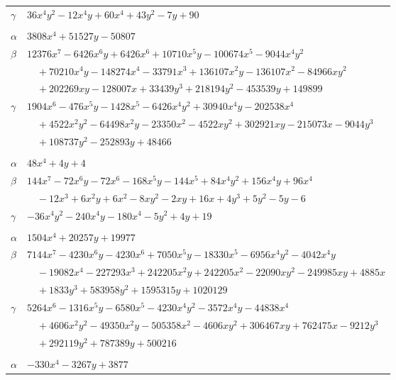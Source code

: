 \documentclass[11pt]{article}
\begin{document}
\begin{longtable}{@{}ll@{}}
$\gamma$ & $36x^{4}y^{2}-12x^{4}y+60x^{4}+43y^{2}-7y+90$\\
\addlinespace[3pt]
\multicolumn{2}{@{}l}{$\{i,j\}=\{8,103\}$, $k_{ij}=2^{4}\cdot 3^{3}\cdot 5$}\\
$\alpha$ & $3808x^{4}+51527y-50807$\\
$\beta$ & $12376x^{7}-6426x^{6}y+6426x^{6}+10710x^{5}y-100674x^{5}-9044x^{4}y^{2}$\\
 & $\quad +70210x^{4}y-148274x^{4}-33791x^{3}+136107x^{2}y-136107x^{2}-84966xy^{2}$\\
 & $\quad +202269xy-128007x+33439y^{3}+218194y^{2}-453539y+149899$\\
$\gamma$ & $1904x^{6}-476x^{5}y-1428x^{5}-6426x^{4}y^{2}+30940x^{4}y-202538x^{4}$\\
 & $\quad +4522x^{2}y^{2}-64498x^{2}y-23350x^{2}-4522xy^{2}+302921xy-215073x-9044y^{3}$\\
 & $\quad +108737y^{2}-252893y+48466$\\
\addlinespace[3pt]
\multicolumn{2}{@{}l}{$\{i,j\}=\{9,19\}$, $k_{ij}=2\cdot 5$}\\
$\alpha$ & $48x^{4}+4y+4$\\
$\beta$ & $144x^{7}-72x^{6}y-72x^{6}-168x^{5}y-144x^{5}+84x^{4}y^{2}+156x^{4}y+96x^{4}$\\
 & $\quad -12x^{3}+6x^{2}y+6x^{2}-8xy^{2}-2xy+16x+4y^{3}+5y^{2}-5y-6$\\
$\gamma$ & $-36x^{4}y^{2}-240x^{4}y-180x^{4}-5y^{2}+4y+19$\\
\addlinespace[3pt]
\multicolumn{2}{@{}l}{$\{i,j\}=\{9,104\}$, $k_{ij}=2^{3}\cdot 5\cdot 7$}\\
$\alpha$ & $1504x^{4}+20257y+19977$\\
$\beta$ & $7144x^{7}-4230x^{6}y-4230x^{6}+7050x^{5}y-18330x^{5}-6956x^{4}y^{2}-4042x^{4}y$\\
 & $\quad -19082x^{4}-227293x^{3}+242205x^{2}y+242205x^{2}-22090xy^{2}-249985xy+4885x$\\
 & $\quad +1833y^{3}+583958y^{2}+1595315y+1020129$\\
$\gamma$ & $5264x^{6}-1316x^{5}y-6580x^{5}-4230x^{4}y^{2}-3572x^{4}y-44838x^{4}$\\
 & $\quad +4606x^{2}y^{2}-49350x^{2}y-505358x^{2}-4606xy^{2}+306467xy+762475x-9212y^{3}$\\
 & $\quad +292119y^{2}+787389y+500216$\\
\addlinespace[3pt]
\multicolumn{2}{@{}l}{$\{i,j\}=\{9,105\}$, $k_{ij}=2^{6}\cdot 5\cdot 7$}\\
$\alpha$ & $-330x^{4}-3267y+3877$\\

\end{longtable}
\end{document}
